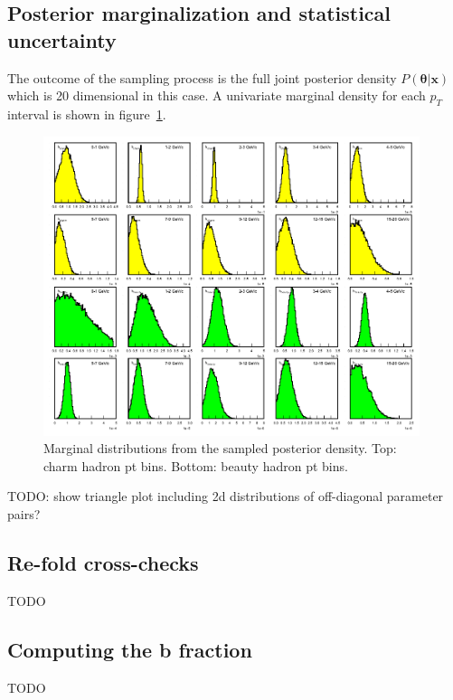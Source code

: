 \documentclass[12pt]{article}
\newcommand{\xvec}{\mathbf{x}}
\newcommand{\thetavec}{\mathbf{\theta}}
\newcommand{\post}{P(\thetavec|\xvec)}
\begin{document}
\subsection{Posterior marginalization and statistical uncertainty}
The outcome of the sampling process is the full joint posterior density $\post$ which is 20 dimensional in this case. A univariate marginal density for each $p_T$ interval is shown in figure~\ref{fig:post}.
\begin{figure}[tb]
  \begin{center}
    \includegraphics[width=0.98\textwidth]{AuAu200MB/2/posterior}
  \end{center}
  \caption{Marginal distributions from the sampled posterior density. Top: charm hadron pt bins. Bottom: beauty hadron pt bins.}
  \label{fig:post}
\end{figure}
TODO: show triangle plot including 2d distributions of off-diagonal parameter pairs?

\subsection{Re-fold cross-checks}
TODO
\subsection{Computing the b fraction}
TODO

\end{document}

